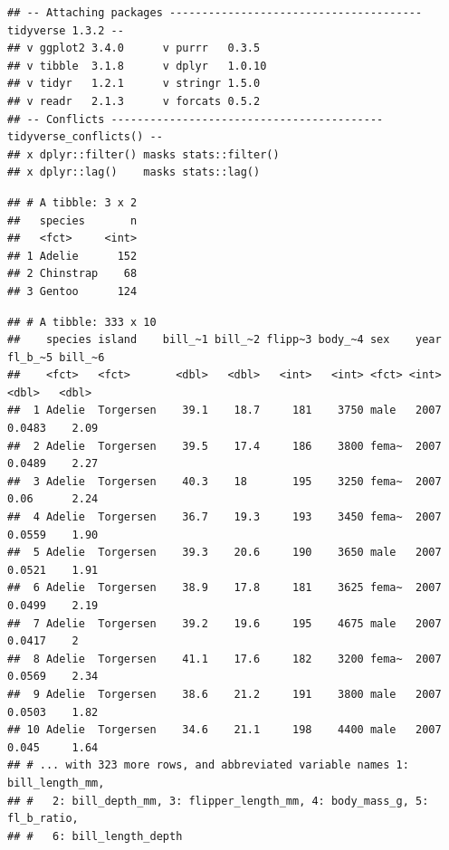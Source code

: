 \documentclass[water,article,submit,moreauthors,pdftex]{mdpi}
\begin{document}
\begin{verbatim}
## -- Attaching packages --------------------------------------- tidyverse 1.3.2 --
## v ggplot2 3.4.0      v purrr   0.3.5 
## v tibble  3.1.8      v dplyr   1.0.10
## v tidyr   1.2.1      v stringr 1.5.0 
## v readr   2.1.3      v forcats 0.5.2 
## -- Conflicts ------------------------------------------ tidyverse_conflicts() --
## x dplyr::filter() masks stats::filter()
## x dplyr::lag()    masks stats::lag()
\end{verbatim}

\begin{verbatim}
## # A tibble: 3 x 2
##   species       n
##   <fct>     <int>
## 1 Adelie      152
## 2 Chinstrap    68
## 3 Gentoo      124
\end{verbatim}

\begin{verbatim}
## # A tibble: 333 x 10
##    species island    bill_~1 bill_~2 flipp~3 body_~4 sex    year fl_b_~5 bill_~6
##    <fct>   <fct>       <dbl>   <dbl>   <int>   <int> <fct> <int>   <dbl>   <dbl>
##  1 Adelie  Torgersen    39.1    18.7     181    3750 male   2007  0.0483    2.09
##  2 Adelie  Torgersen    39.5    17.4     186    3800 fema~  2007  0.0489    2.27
##  3 Adelie  Torgersen    40.3    18       195    3250 fema~  2007  0.06      2.24
##  4 Adelie  Torgersen    36.7    19.3     193    3450 fema~  2007  0.0559    1.90
##  5 Adelie  Torgersen    39.3    20.6     190    3650 male   2007  0.0521    1.91
##  6 Adelie  Torgersen    38.9    17.8     181    3625 fema~  2007  0.0499    2.19
##  7 Adelie  Torgersen    39.2    19.6     195    4675 male   2007  0.0417    2   
##  8 Adelie  Torgersen    41.1    17.6     182    3200 fema~  2007  0.0569    2.34
##  9 Adelie  Torgersen    38.6    21.2     191    3800 male   2007  0.0503    1.82
## 10 Adelie  Torgersen    34.6    21.1     198    4400 male   2007  0.045     1.64
## # ... with 323 more rows, and abbreviated variable names 1: bill_length_mm,
## #   2: bill_depth_mm, 3: flipper_length_mm, 4: body_mass_g, 5: fl_b_ratio,
## #   6: bill_length_depth
\end{verbatim}
\end{document}
